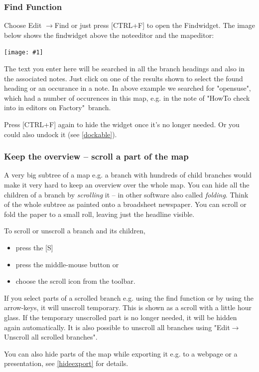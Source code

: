 \documentclass[12pt,a4paper]{article}
\newcommand{\maximage}[1]{  
    \begin{center}
        \texttt{[image: \#1]} 
    \end{center}
}
\newcommand{\ra}{$\longrightarrow$}
\newcommand{\key}[1]{[#1]}
\begin{document}
\subsubsection*{Find Function} \label{findwindow}
Choose Edit \ra Find or just press \key{CTRL+F} to open
the Findwidget. The image below shows the findwidget above the
noteeditor and the mapeditor:
\begin{center}
    \maximage{images/find-window.png}
\end{center}    
The text you enter here will be searched in all the
branch headings and also in the associated notes. Just click on one of
the results shown to select the found heading or an occurance in a note.
In above example we searched for "opensuse", which had a number of
occurences in this map, e.g. in the note of "HowTo check into in
editors on Factory"\ branch.

Press \key{CTRL+F} again to hide the widget once it's no longer needed.
Or you could also undock it (see \ref{dockable}).

\subsubsection*{Keep the overview -- scroll a part of the map}
A very big subtree of a map e.g. a branch with hundreds of child
branches would make it very hard to keep an overview over the whole map.
You can hide all the children of a branch by {\em scrolling} it -- in
other software also called {\em folding}. Think of the whole subtree as
painted onto a broadsheet newspaper. You can scroll or fold the paper to
a small roll, leaving just the headline visible.

To scroll or unscroll a branch and its children,
\begin{itemize}
    \item press the \key{S}
    \item press the middle-mouse button or
    \item choose the scroll icon from the toolbar.
\end{itemize}
If you select parts of a scrolled branch e.g. using the find function or
by using the arrow-keys, it will unscroll temporary. This is shown as a
scroll with a little hour glass. If the temporary unscrolled part is no
longer needed, it will be hidden again automatically. It is also
possible to unscroll all branches using "Edit\ra Unscroll all scrolled
branches".

You can also hide parts of the map while exporting it e.g. to a webpage
or a presentation, see \ref{hideexport} for details.
\end{document}
